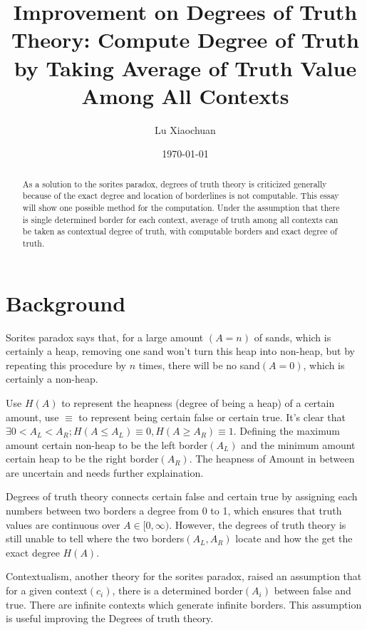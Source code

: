 \documentclass{article}
\title{Improvement on Degrees of Truth Theory: Compute Degree of Truth by Taking Average of Truth Value Among All Contexts}
\author{Lu Xiaochuan}
\date{\today}
\begin{document}
\maketitle

\begin{abstract}
	As a solution to the sorites paradox, degrees of truth theory is criticized generally because of the exact degree and location of borderlines is not computable. This essay will show one possible method for the computation. Under the assumption that there is single determined border for each context, average of truth among all contexts can be taken as contextual degree of truth, with computable borders and exact degree of truth.
\end{abstract}

\section{Background}

Sorites paradox says that, for a large amount $(A=n)$ of sands, which is certainly a heap, removing one sand won't turn this heap into non-heap, but by repeating this procedure by $n$ times, there will be no sand$(A=0)$, which is certainly a non-heap.

Use $H(A)$ to represent the heapness (degree of being a heap) of a certain amount, use $\equiv$ to represent being certain false or certain true. It's clear that $\exists{0<A_L<A_R}; H(A\leq A_L)\equiv 0, H(A\geq A_R)\equiv 1$.  Defining the maximum amount certain non-heap to be the left border$(A_L)$ and the minimum amount certain heap to be the right border$(A_R)$. The heapness of Amount in between are uncertain and needs further explaination.

Degrees of truth theory connects certain false and certain true by assigning each numbers between two borders a degree from 0 to 1, which ensures that truth values are continuous over $A \in [0, \infty)$. However, the degrees of truth theory is still unable to tell where the two borders$(A_L,A_R)$ locate and how the get the exact degree $H(A)$.

Contextualism, another theory for the sorites paradox, raised an assumption that for a given context$(c_i)$, there is a determined border$(A_i)$ between false and true. There are infinite contexts which generate infinite borders. This assumption is useful improving the Degrees of truth theory.

\clearpage
\end{document}
